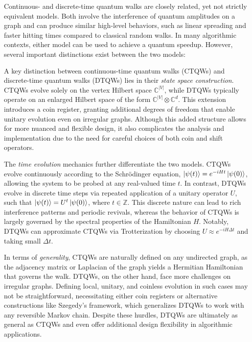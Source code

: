 \documentclass[12pt]{report}
\begin{document}
Continuous- and discrete-time quantum walks are closely related, yet not strictly equivalent models. Both involve the interference of quantum amplitudes on a graph and can produce similar high-level behaviors, such as linear spreading and faster hitting times compared to classical random walks. In many algorithmic contexts, either model can be used to achieve a quantum speedup. However, several important distinctions exist between the two models:


A key distinction between continuous-time quantum walks (CTQWs) and discrete-time quantum walks (DTQWs) lies in their \textit{state space construction}. CTQWs evolve solely on the vertex Hilbert space $\mathbb{C}^{|V|}$, while DTQWs typically operate on an enlarged Hilbert space of the form $\mathbb{C}^{|V|} \otimes \mathbb{C}^d$. This extension introduces a coin register, granting additional degrees of freedom that enable unitary evolution even on irregular graphs. Although this added structure allows for more nuanced and flexible design, it also complicates the analysis and implementation due to the need for careful choices of both coin and shift operators.

The \textit{time evolution} mechanics further differentiate the two models. CTQWs evolve continuously according to the Schrödinger equation, $\ket{\psi(t)} = e^{-iHt} \ket{\psi(0)}$, allowing the system to be probed at any real-valued time $t$. In contrast, DTQWs evolve in discrete time steps via repeated application of a unitary operator $U$, such that $\ket{\psi(t)} = U^t \ket{\psi(0)}$, where $t \in \mathbb{Z}$. This discrete nature can lead to rich interference patterns and periodic revivals, whereas the behavior of CTQWs is largely governed by the spectral properties of the Hamiltonian $H$. Notably, DTQWs can approximate CTQWs via Trotterization by choosing $U \approx e^{-iH \Delta t}$ and taking small $\Delta t$.

In terms of \textit{generality}, CTQWs are naturally defined on any undirected graph, as the adjacency matrix or Laplacian of the graph yields a Hermitian Hamiltonian that governs the walk. DTQWs, on the other hand, face more challenges on irregular graphs. Defining local, unitary, and coinless evolution in such cases may not be straightforward, necessitating either coin registers or alternative constructions like Szegedy’s framework, which generalizes DTQWs to work with any reversible Markov chain. Despite these hurdles, DTQWs are ultimately as general as CTQWs and even offer additional design flexibility in algorithmic applications.
\end{document}
